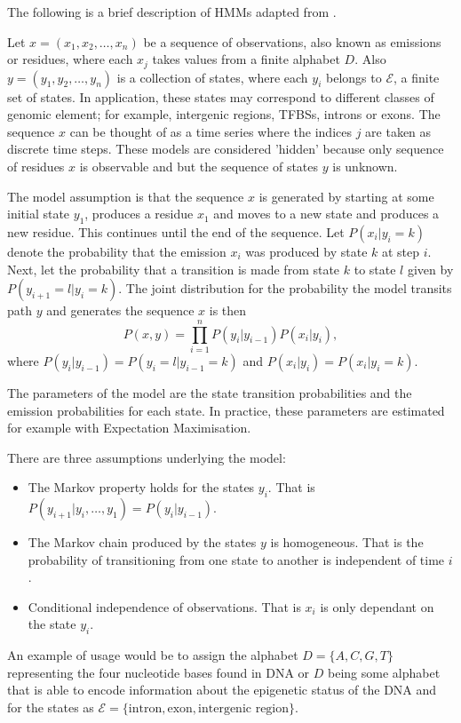 The following is a brief description of HMMs adapted from \cite{mesa2016hidden}. 

Let $x = (x_1,x_2,\ldots,x_n)$ be a sequence of observations, also known as emissions or residues, where each $x_j$ takes values from a finite alphabet $D$. 
Also $y = (y_1,y_2,\ldots,y_n)$ is a collection of states, where each $y_i$ belongs to $\mathcal{E}$, a finite set of states. In application, these states may correspond to different classes of genomic element; for example, intergenic regions, TFBSs, introns or exons. The sequence $x$ can be thought of as a time series where the indices $j$ are taken as discrete time steps. These models are considered 'hidden' because only sequence of residues $x$ is observable and but the sequence of states $y$ is unknown.
 
The model assumption is that the sequence $x$ is generated by starting at some initial state $y_1$, produces a residue $x_1$ and moves to a new state and produces a new residue. This continues until the end of the sequence. Let $P(x_i|y_i = k)$ denote the probability that the emission $x_i$ was produced by state $k$ at step $i$. Next, let the probability that a transition is made from state $k$ to state $l$ given by $P(y_{i+1} = l | y_i = k)$. The joint distribution for the probability the model transits path $y$ and generates the sequence $x$ is then
	\begin{equation}
		P(x,y) = \prod_{i=1}^{n} P(y_i|y_{i-1})P(x_i|y_i),
	\end{equation}
where $P(y_i|y_{i-1}) = P(y_{i} = l | y_{i-1} = k)$ and $P(x_i|y_i) = P(x_i|y_i = k)$. 

The parameters of the model are the state transition probabilities and the emission probabilities for each state. In practice, these parameters are estimated for example with Expectation Maximisation.

There are three assumptions underlying the model:
	\begin{itemize}
		\item The Markov property holds for the states $y_i$. That is $P(y_{i+1}|y_i,\ldots,y_1) = P(y_i|y_{i-1})$.
		\item The Markov chain produced by the states $y$ is homogeneous. That is the probability of transitioning from one state to another is independent of time $i$. 
		\item Conditional independence of observations. That is $x_i$ is only dependant on the state $y_i$. 
	\end{itemize}

An example of usage would be to assign the alphabet $D = \{A,C,G,T\}$ representing the four nucleotide bases found in DNA or $D$ being some alphabet that is able to encode information about the epigenetic status of the DNA and for the states as $\mathcal{E} = \{\text{intron}, \text{exon}, \text{intergenic region}\}$. 






